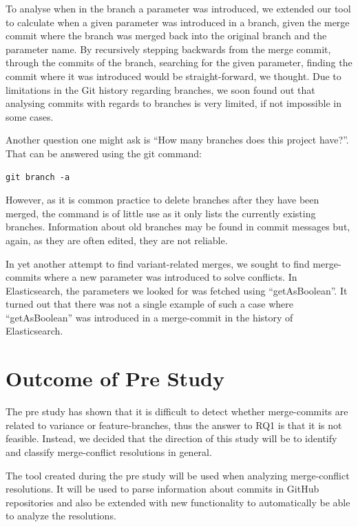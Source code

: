 To analyse when in the branch a parameter was introduced, we extended our tool to calculate when a given parameter was introduced in a branch, given the merge commit where the branch was merged back into the original branch and the parameter name. By recursively stepping backwards from the merge commit, through the commits of the branch, searching for the given parameter, finding the commit where it was introduced would be straight-forward, we thought. Due to limitations in the Git history regarding branches, we soon found out that analysing commits with regards to branches is very limited, if not impossible in some cases.

Another question one might ask is “How many branches does this project have?”. That can be answered using the git command:
\lstset{language=Bash}
\begin{lstlisting}[frame=single]
git branch -a
\end{lstlisting}
However, as it is common practice to delete branches after they have been merged, the command is of little use as it only lists the currently existing branches. Information about old branches may be found in commit messages but, again, as they are often edited, they are not reliable.

In yet another attempt to find variant-related merges, we sought to find merge-commits where a new parameter was introduced to solve conflicts. In Elasticsearch, the parameters we looked for was fetched using “getAsBoolean”. It turned out that there was not a single example of such a case where “getAsBoolean” was introduced in a merge-commit in the history of Elasticsearch.
\section{Outcome of Pre Study}
The pre study has shown that it is difficult to detect whether merge-commits are related to variance or feature-branches, thus the answer to RQ1 is that it is not feasible. Instead, we decided that the direction of this study will be to identify and classify merge-conflict resolutions in general.

The tool created during the pre study will be used when analyzing merge-conflict resolutions. It will be used to parse information about commits in GitHub repositories and also be extended with new functionality to automatically be able to analyze the resolutions.







